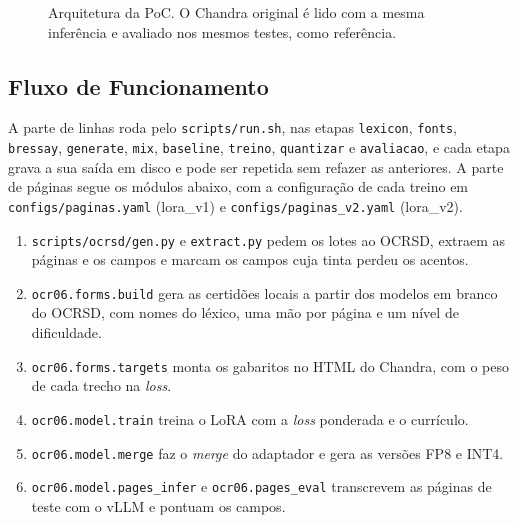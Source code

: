 \begin{figure}[H]
\caption{Arquitetura da PoC. O Chandra original é lido com a mesma inferência e avaliado nos mesmos testes, como referência.}
\label{fig:arquitetura}
\end{figure}

\subsection{Fluxo de Funcionamento}

A parte de linhas roda pelo \texttt{scripts/run.sh}, nas etapas \texttt{lexicon}, \texttt{fonts}, \texttt{bressay}, \texttt{generate}, \texttt{mix}, \texttt{baseline}, \texttt{treino}, \texttt{quantizar} e \texttt{avaliacao}, e cada etapa grava a sua saída em disco e pode ser repetida sem refazer as anteriores. A parte de páginas segue os módulos abaixo, com a configuração de cada treino em \texttt{configs/paginas.yaml} (lora\_v1) e \texttt{configs/paginas\_v2.yaml} (lora\_v2).

\begin{enumerate}
    \item \texttt{scripts/ocrsd/gen.py} e \texttt{extract.py} pedem os lotes ao OCRSD, extraem as páginas e os campos e marcam os campos cuja tinta perdeu os acentos.
    \item \texttt{ocr06.forms.build} gera as certidões locais a partir dos modelos em branco do OCRSD, com nomes do léxico, uma mão por página e um nível de dificuldade.
    \item \texttt{ocr06.forms.targets} monta os gabaritos no HTML do Chandra, com o peso de cada trecho na \emph{loss}.
    \item \texttt{ocr06.model.train} treina o LoRA com a \emph{loss} ponderada e o currículo.
    \item \texttt{ocr06.model.merge} faz o \emph{merge} do adaptador e gera as versões FP8 e INT4.
    \item \texttt{ocr06.model.pages\_infer} e \texttt{ocr06.pages\_eval} transcrevem as páginas de teste com o vLLM e pontuam os campos.
\end{enumerate}

